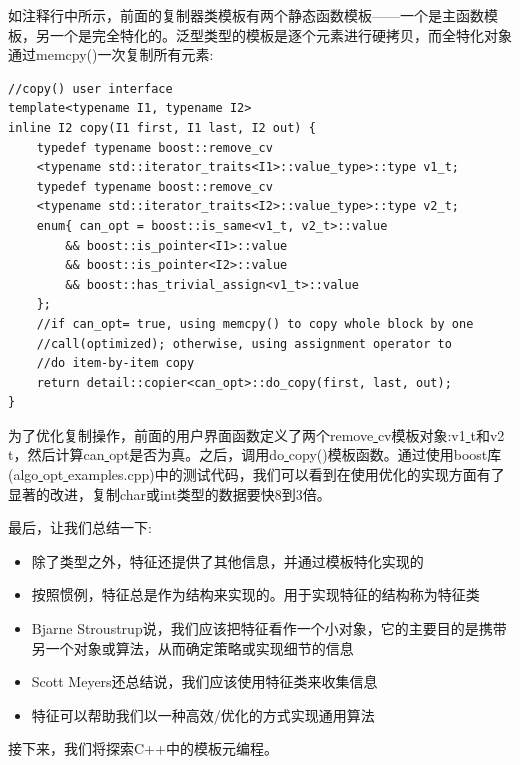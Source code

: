 如注释行中所示，前面的复制器类模板有两个静态函数模板——一个是主函数模板，另一个是完全特化的。泛型类型的模板是逐个元素进行硬拷贝，而全特化对象通过memcpy()一次复制所有元素: \par

\begin{lstlisting}[caption={}]
//copy() user interface
template<typename I1, typename I2>
inline I2 copy(I1 first, I1 last, I2 out) {
	typedef typename boost::remove_cv
	<typename std::iterator_traits<I1>::value_type>::type v1_t;
	typedef typename boost::remove_cv
	<typename std::iterator_traits<I2>::value_type>::type v2_t;
	enum{ can_opt = boost::is_same<v1_t, v2_t>::value
		&& boost::is_pointer<I1>::value
		&& boost::is_pointer<I2>::value
		&& boost::has_trivial_assign<v1_t>::value
	};
	//if can_opt= true, using memcpy() to copy whole block by one
	//call(optimized); otherwise, using assignment operator to
	//do item-by-item copy
	return detail::copier<can_opt>::do_copy(first, last, out);
}
\end{lstlisting}

为了优化复制操作，前面的用户界面函数定义了两个remove\underline{ }cv模板对象:v1\underline{ }t和v2\underline{ }t，然后计算can\underline{ }opt是否为真。之后，调用do\underline{ }copy()模板函数。通过使用boost库(algo\underline{ }opt\underline{ }examples.cpp)中的测试代码，我们可以看到在使用优化的实现方面有了显著的改进，复制char或int类型的数据要快8到3倍。 \par
最后，让我们总结一下: \par

\begin{itemize}
	\item 除了类型之外，特征还提供了其他信息，并通过模板特化实现的
	\item 按照惯例，特征总是作为结构来实现的。用于实现特征的结构称为特征类
	\item Bjarne Stroustrup说，我们应该把特征看作一个小对象，它的主要目的是携带另一个对象或算法，从而确定策略或实现细节的信息
	\item Scott Meyers还总结说，我们应该使用特征类来收集信息
	\item 特征可以帮助我们以一种高效/优化的方式实现通用算法
\end{itemize}

接下来，我们将探索C++中的模板元编程。 \par

